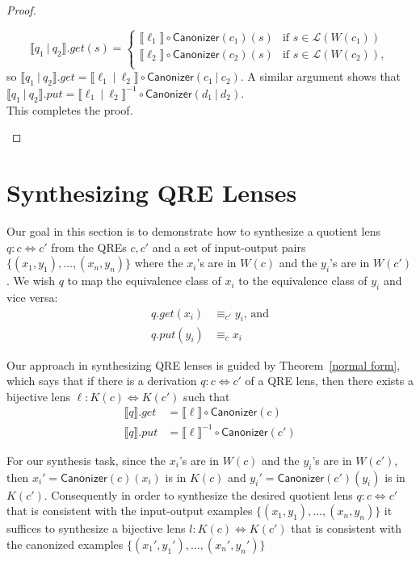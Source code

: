 \documentclass[acmsmall,review,anonymous]{acmart}\settopmatter{printfolios=true,printccs=false,printacmref=false}
\newcommand{\kw}[1]{\ensuremath{\mathsf{#1}}}
\newcommand{\sep}{\ensuremath{\ | \ }}
\newcommand{\canonizer}{\ensuremath{\kw{Canonizer}}}
\begin{document}
\begin{proof}
\begin{enumerate}
$$
\llbracket q_1 \sep q_2 \rrbracket.get(s) =
\begin{cases}
\llbracket \ell_1 \rrbracket \circ
\canonizer(c_1) (s) & \text{if } s \in \mathcal{L}(W(c_1))\\
\llbracket \ell_2 \rrbracket \circ
\canonizer(c_2) (s) & \text{if } s \in \mathcal{L}(W(c_2)),\\
\end{cases}$$
so $\llbracket q_1 \sep q_2 \rrbracket.get = \llbracket \ell_1 \sep
\ell_2 \rrbracket \circ \canonizer(c_1 \sep c_2)$. A similar argument shows
that $\llbracket q_1 \sep q_2 \rrbracket.put = \llbracket \ell_1 \sep
\ell_2 \rrbracket^{-1} \circ \canonizer(d_1 \sep d_2)$.\\
This completes the proof.
\end{enumerate}
\end{proof}

\fi
\section{Synthesizing QRE Lenses}
\label{synth}
Our goal in this section is to demonstrate how to synthesize a quotient lens
$q: c \Leftrightarrow c'$ from the QREs $c, c'$ and a set of input-output pairs
$\{(x_1, y_1), \ldots, (x_n, y_n)\}$ where the $x_i$'s are in $W(c)$ and the
$y_i$'s are in $W(c')$. We wish $q$ to map the equivalence class of $x_i$ to the
equivalence class of $y_i$ and vice versa:
\begin{align*}
q.get(x_i) &\equiv_{c'} y_i \text{, and}\\
q.put(y_i) &\equiv_c x_i
\end{align*}

Our approach in synthesizing QRE lenses is guided by Theorem~\ref{normal
form}, which says that if there is a derivation $q :
c \Leftrightarrow c'$ of a QRE lens, then there exists a bijective lens $\ell :
K(c) \Leftrightarrow K(c')$ such that
\begin{align*}
\llbracket q \rrbracket.get &= \llbracket \ell \rrbracket\circ \canonizer(c)\\
\llbracket q \rrbracket.put &= \llbracket \ell \rrbracket^{-1} \circ
\canonizer(c')
\end{align*}

For our synthesis task, since the $x_i$'s are in $W(c)$ and the $y_i$'s are
in $W(c')$, then ${x_i}' = \canonizer(c)(x_i)$ is in $K(c)$ and ${y_i}' =
\canonizer(c')(y_i)$ is in $K(c')$. Consequently in order to synthesize the
desired quotient lens $q: c \Leftrightarrow c'$ that is consistent with the
input-output examples $\{(x_1, y_1), \ldots, (x_n, y_n)\}$ it suffices to
synthesize a bijective lens $l :
K(c) \Leftrightarrow K(c')$ that is consistent with the canonized examples
$\{({x_1}', {y_1}'), \ldots, ({x_n}', {y_n}')\}$
\end{document}
